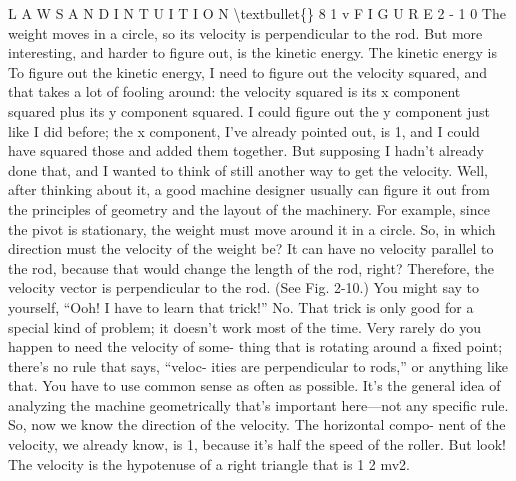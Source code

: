 \documentclass[10pt,oneside]{article}
\begin{document}
L A W S  A N D  I N T U I T I O N \textbackslash{}textbullet\{\} 8 1 v F I G U R E  2 - 1 0 The weight moves in a circle, so its velocity is perpendicular to the rod. But more interesting, and harder to figure out, is the kinetic energy. The kinetic energy is To figure out the kinetic energy, I need to figure out the velocity squared, and that takes a lot of fooling around: the velocity squared is its x component squared plus its y component squared. I could figure out the y component just like I did before; the x component, I’ve already pointed out, is 1, and I could have squared those and added them together. But supposing I hadn’t already done that, and I wanted to think of still another way to get the velocity. Well, after thinking about it, a good machine designer usually can figure it out from the principles of geometry and the layout of the machinery. For example, since the pivot is stationary, the weight must move around it in a circle. So, in which direction must the velocity of the weight be? It can have no velocity parallel to the rod, because that would change the length of the rod, right? Therefore, the velocity vector is perpendicular to the rod. (See Fig. 2-10.) You might say to yourself, “Ooh! I have to learn that trick!” No. That trick is only good for a special kind of problem; it doesn’t work most of the time. Very rarely do you happen to need the velocity of some- thing that is rotating around a fixed point; there’s no rule that says, “veloc- ities are perpendicular to rods,” or anything like that. You have to use common sense as often as possible. It’s the general idea of analyzing the machine geometrically that’s important here---not any specific rule. So, now we know the direction of the velocity. The horizontal compo- nent of the velocity, we already know, is 1, because it’s half the speed of the roller. But look! The velocity is the hypotenuse of a right triangle that is 1 2 mv2.\par
\end{document}
